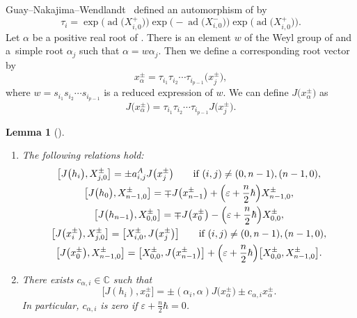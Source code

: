 \documentclass[pdftex]{sigma}
\numberwithin{equation}{section}
\newtheorem{Lemma}[Theorem]{Lemma}
\theoremstyle{definition}
\DeclareMathOperator{\ad}{ad}
\newcommand{\ve}{\varepsilon}
\begin{document}
Guay--Nakajima--Wendlandt~\cite{GNW} defined an automorphism of \smash{$Y_{\hbar,\ve}\bigl(\widehat{\mathfrak{sl}}(n)\bigr)$} by
\begin{equation*}
\tau_i=\exp\bigl(\ad\bigl(X^+_{i,0}\bigr)\bigr)\exp\bigl(-\ad\bigl(X^-_{i,0}\bigr)\bigr)\exp\bigl(\ad\bigl(X^+_{i,0}\bigr)\bigr).
\end{equation*}
Let $\alpha$ be a positive real root of . There is an element $w$ of the Weyl group of  and a~simple root $\alpha_j$ such that $\alpha=w\alpha_j$. Then we define a corresponding root vector by
\begin{equation*}
x^\pm_\alpha=\tau_{i_1}\tau_{i_2}\cdots\tau_{i_{p-1}}\bigl(x^\pm_{j}\bigr),
\end{equation*}
where $w =s_{i_1}s_{i_2}\cdots s_{i_{p-1}}$ is a reduced expression of $w$.
We can define $J\bigl(x^\pm_\alpha\bigr)$ as
\begin{equation*}
J\bigl(x^\pm_\alpha\bigr)=\tau_{i_1}\tau_{i_2}\cdots\tau_{i_{p-1}}J\bigl(x^\pm_{j}\bigr).
\end{equation*}
\begin{Lemma}[{\cite[equation~(3.14) and Proposition 3.21]{GNW}}]\label{J}\qquad
\begin{enumerate}\itemsep=0pt
\item[$(1)$] The following relations hold:
\begin{gather*}
\bigl[J\bigl(h_i\bigr),X^\pm_{j,0}\bigr]=\pm a^A_{i,j}J\bigl(x^\pm_j\bigr)\qquad \text{if } (i,j )\neq (0,n-1 ), (n-1,0 ),\\
\bigl[J\bigl(h_{0}\bigr),X^\pm_{n-1,0}\bigr]=\mp J\bigl(x^\pm_{n-1}\bigr)+\Bigl(\ve+\frac{n}{2}\hbar\Bigr) X_{n-1, 0}^{\pm},\\
\bigl[J\bigl(h_{n-1}\bigr),X^\pm_{0,0}\bigr]=\mp J\bigl(x^\pm_{0}\bigr)-\Bigl(\ve+\frac{n}{2}\hbar\Bigr) X_{0, 0}^{\pm},\\
\bigl[J\bigl(x^\pm_i\bigr), X_{j, 0}^{\pm}\bigr]=\bigl[X_{i, 0}^{\pm}, J\bigl(x^\pm_j\bigr)\bigr]\qquad \text{if } (i,j )\neq (0,n-1 ), (n-1,0 ),\\
\bigl[J\bigl(x^\pm_{0}\bigr), X_{n-1, 0}^{\pm}\bigr]=\bigl[X_{0, 0}^{\pm}, J\bigl(x^\pm_{n-1}\bigr)\bigr]+ \Bigl(\ve+\frac{n}{2}\hbar\Bigr) \bigl[X_{0, 0}^{\pm}, X_{n-1, 0}^{\pm}\bigr].
\end{gather*}
\item[$(2)$]
There exists $c_{\alpha,i}\in\mathbb{C}$ such that
\begin{equation*}
\bigl[J(h_i),x^\pm_\alpha\bigr]=\pm(\alpha_i,\alpha)J\bigl(x_\alpha^\pm\bigr)\pm c_{\alpha,i}x_\alpha^\pm.
\end{equation*}
In particular, $c_{\alpha,i}$ is zero if $\ve+\frac{n}{2}\hbar=0$.
\end{enumerate}
\end{Lemma}
\end{document}
